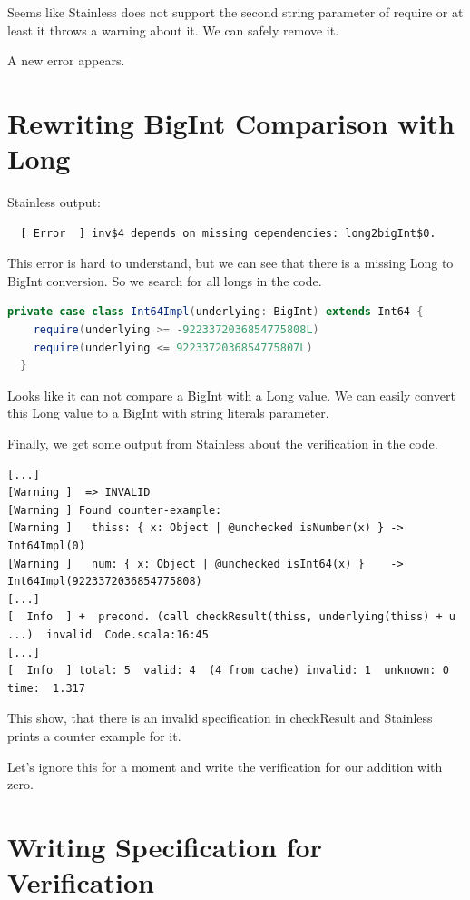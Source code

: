 Seems like Stainless does not support the second string parameter of require or at least it throws a warning about it.
We can safely remove it.

A new error appears.


\section{Rewriting BigInt Comparison with Long}

Stainless output:
{\footnotesize\begin{verbatim}
  [ Error  ] inv$4 depends on missing dependencies: long2bigInt$0.
\end{verbatim}}

This error is hard to understand, but we can see that there is a missing Long to BigInt conversion.
So we search for all longs in the code.
\begin{lstlisting}[language=scala]
  private case class Int64Impl(underlying: BigInt) extends Int64 {
    require(underlying >= -9223372036854775808L)
    require(underlying <= 9223372036854775807L)
  }
\end{lstlisting}

Looks like it can not compare a BigInt with a Long value.
We can easily convert this Long value to a BigInt with string literals parameter.

Finally, we get some output from Stainless about the verification in the code.
{\footnotesize\begin{verbatim}
[...]
[Warning ]  => INVALID
[Warning ] Found counter-example:
[Warning ]   thiss: { x: Object | @unchecked isNumber(x) } -> Int64Impl(0)
[Warning ]   num: { x: Object | @unchecked isInt64(x) }    -> Int64Impl(9223372036854775808)
[...]
[  Info  ] +  precond. (call checkResult(thiss, underlying(thiss) + u ...)  invalid  Code.scala:16:45
[...]
[  Info  ] total: 5  valid: 4  (4 from cache) invalid: 1  unknown: 0  time:  1.317
\end{verbatim}}

This show, that there is an invalid specification in checkResult and Stainless prints a counter example for it.

Let's ignore this for a moment and write the verification for our addition with zero.


\section{Writing Specification for Verification}

